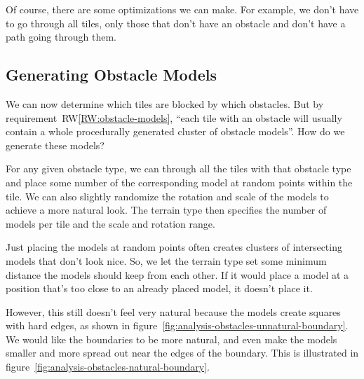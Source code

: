 Of course, there are some optimizations we can make.
For example, we don't have to go through all tiles, only those that don't have an obstacle and don't have a path going through them.

\subsection{Generating Obstacle Models}

We can now determine which tiles are blocked by which obstacles.
But by requirement~RW\ref{RW:obstacle-models}, \enquote{each tile with an obstacle will usually contain a whole procedurally generated cluster of obstacle models}.
How do we generate these models?

For any given obstacle type, we can through all the tiles with that obstacle type and place some number of the corresponding model at random points within the tile.
We can also slightly randomize the rotation and scale of the models to achieve a more natural look.
The terrain type then specifies the number of models per tile and the scale and rotation range.

Just placing the models at random points often creates clusters of intersecting models that don't look nice.
So, we let the terrain type set some minimum distance the models should keep from each other.
If it would place a model at a position that's too close to an already placed model, it doesn't place it.

However, this still doesn't feel very natural because the models create squares with hard edges, as shown in figure~\ref{fig:analysis-obstacles-unnatural-boundary}.
We would like the boundaries to be more natural, and even make the models smaller and more spread out near the edges of the boundary.
This is illustrated in figure~\ref{fig:analysis-obstacles-natural-boundary}.

